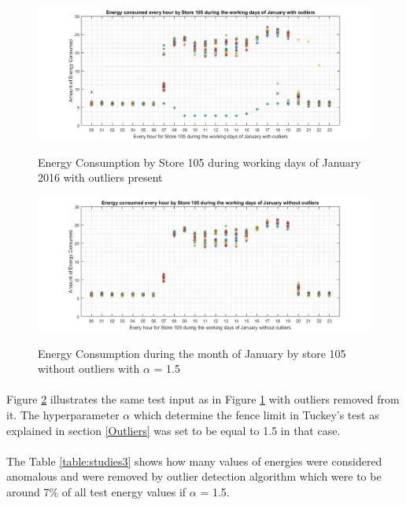 \documentclass[12pt]{article}
\begin{document}
\begin{figure}[H]
	\centering
	{\includegraphics[scale=0.40]{105_ol_new_last.jpg}\label{7blockdiag}
	}
	\caption[The Block Diagram of the designed application]{Energy Consumption by Store 105 during working days of January 2016 with outliers present}
	\label{7blockdiag}
	\hspace{0.7cm}%
\end{figure}

\begin{figure}[H]
	\centering
	{\includegraphics[scale=0.40]{alpha_15.jpg}\label{7QRX4}
	}
	\caption[Energy Consumption during the month of January by store 105 (same dataset as in Figure \ref{7blockdiag}) without outliers]{Energy Consumption during the month of January by store 105 without outliers with $\alpha$ = 1.5}
	\label{7QRX4}
	\hspace{1cm}%
\end{figure}
\paragraph{}Figure \ref{7QRX4} illustrates the same test input as in Figure \ref{7blockdiag} with outliers removed from it. The hyperparameter $\alpha$ which determine the fence limit in Tuckey's test as explained in section \ref{Outliers} was set to be equal to 1.5 in that case. 
\paragraph{} The Table \ref{table:studies3} shows how many values of energies were considered anomalous and were removed by outlier detection algorithm which were to be around 7\% of all test energy values if $\alpha$ = 1.5.
\end{document}
